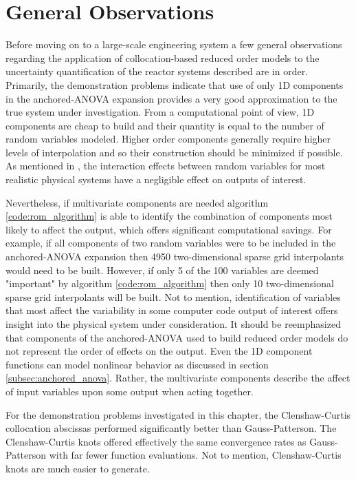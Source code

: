 \section{General Observations}
\label{sec:general_observations}

Before moving on to a large-scale engineering system a few general observations regarding the application of collocation-based reduced order models to the uncertainty quantification of the  reactor systems described are in order. Primarily, the demonstration problems indicate that use of only 1D components in the anchored-\ac{ANOVA} expansion provides a very good approximation to the true system under investigation. From a computational point of view, 1D components are cheap to build and their quantity is equal to the number of random variables modeled. Higher order components generally require higher levels of interpolation and so their construction should be minimized if possible. As mentioned in \cite{AHSGC_HighDimensions}, the interaction effects between random variables for most realistic physical systems have a negligible effect on outputs of interest. 

Nevertheless, if multivariate components are needed algorithm \ref{code:rom_algorithm} is able to identify the combination of components most likely to affect the output, which offers significant computational savings. For example, if all components of two random variables were to be included in the anchored-\ac{ANOVA} expansion then 4950 two-dimensional sparse grid interpolants would need to be built. However, if only 5 of the 100 variables are deemed "important" by algorithm \ref{code:rom_algorithm} then only 10 two-dimensional sparse grid interpolants will be built. Not to mention, identification of variables that most affect the variability in some computer code output of interest offers insight into the physical system under consideration. It should be reemphasized that components of the anchored-\ac{ANOVA} used to build reduced order models do not represent the order of effects on the output. Even the 1D component functions can model nonlinear behavior as discussed in section \ref{subsec:anchored_anova}. Rather, the multivariate components describe the affect of input variables upon some output when acting together.    

For the demonstration problems investigated in this chapter, the Clenshaw-Curtis collocation abscissas performed significantly better than Gauss-Patterson. The Clenshaw-Curtis knots offered effectively the same convergence rates as Gauss-Patterson with far fewer function evaluations. Not to mention, Clenshaw-Curtis knots are much easier to generate. 

